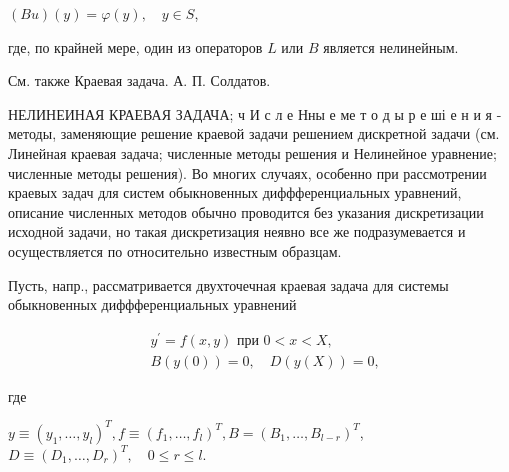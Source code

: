 \documentclass[10pt]{article}
\begin{document}
$(B u)(y)=\varphi(y), \quad y \in S$,



где, по крайней мере, один из операторов $L$ или $B$ является нелинейным.



См. также Краевая задача. А. П. Солдатов.



НЕЛИНЕИНАЯ КРАЕВАЯ ЗАДАЧА; ч И с л е Нны е ме т о д ы р е ші е н и я - методы, заменяющие решение краевой задачи решением дискретной задачи (см. Линейная краевая задача; численные методы решения и Нелинейное уравнение; численные методы решения). Во многих случаях, особенно при рассмотрении краевых задач для систем обыкновенных диффференциальных уравнений, описание численных методов обычно проводится без указания дискретизации исходной задачи, но такая дискретизация неявно все же подразумевается и осуществляется по относительно известным образцам.



Пусть, напр., рассматривается двухточечная краевая задача для системы обыкновенных диффференциальных уравнений



\[

\begin{aligned}

& y^{\prime}=f(x, y) \text { при } 0<x<X, \\

& B(y(0))=0, \quad D(y(X))=0,

\end{aligned}

\]



где



$y \equiv\left(y_{1}, \ldots, y_{l}\right)^{T}, f \equiv\left(f_{1}, \ldots, f_{l}\right)^{T}, B=\left(B_{1}, \ldots, B_{l-r}\right)^{T}$, $D \equiv\left(D_{1}, \ldots, D_{r}\right)^{T}, \quad 0 \leqslant r \leqslant l$.
\end{document}
